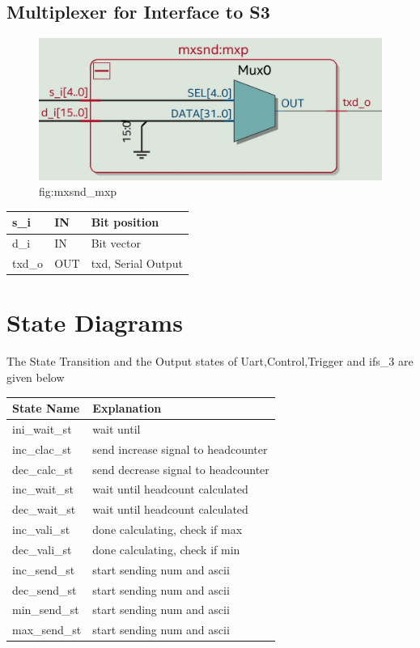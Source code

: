 \documentclass[12pt,a4 paper] {report}
\begin{document}
\subsection{Multiplexer for Interface to S3}
\begin{figure}[h]
	\centering	
	\includegraphics[scale=0.2]{../png/mxsnd_mxp.png}
	\newline
	fig:mxsnd\_mxp\\
\end{figure}
\begin{center}
	\begin{tabular}{| p{2cm} | p{2cm} | p{4cm} |}
		\hline
		s\_i  & IN & Bit position\\
		\hline
		d\_i   & IN  &  Bit vector\\
		\hline	
		txd\_o & OUT & txd, Serial Output\\
		\hline
		
	\end{tabular}
\end{center}
\newpage
\section{State Diagrams}
The State Transition and the Output states of Uart,Control,Trigger and ifs\_3 are given below\\
 \begin{center}
	\begin{tabular}{| p{4cm} | p{7cm} |}
		\hline
		State Name & Explanation \\
		\hline
		ini\_wait\_st & wait until\\
		\hline
		inc\_clac\_st& send increase signal to headcounter\\
		\hline
		dec\_calc\_st&     send decrease signal to headcounter\\
		\hline
		inc\_wait\_st&    wait until headcount calculated\\
		\hline
		dec\_wait\_st&     wait until headcount calculated\\
		\hline
		inc\_vali\_st&    done calculating, check if max\\
		\hline
		dec\_vali\_st&     done calculating, check if min\\
		\hline
		inc\_send\_st&    start sending num and ascii\\
		\hline
		dec\_send\_st&    start sending num and ascii\\
		\hline
		min\_send\_st&    start sending num and ascii\\
		\hline
		max\_send\_st&     start sending num and ascii\\
		\hline
	\end{tabular}
\end{center}
\newpage
\end{document}
